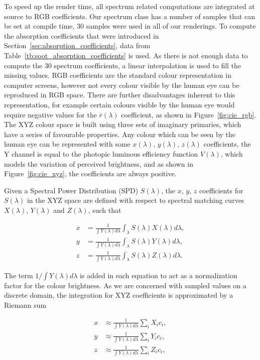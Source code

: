 To speed up the render time, all spectrum related computations are integrated at source to RGB coefficients.
Our spectrum class has a number of samples that can be set at compile time, 30 samples were used in all of our renderings.
To compute the absorption coefficients that were introduced in Section~\ref{sec:absorption_coefficients}, data from Table~\ref{tb:soot_absorption_coefficients} is used.
As there is not enough data to compute the 30 spectrum coefficients, a linear interpolation is used to fill the missing values.
RGB coefficients are the standard colour representation in computer screens, however not every colour visible by the human eye can be reproduced in RGB space.
There are further disadvantages inherent to this representation, for example certain colours visible by the human eye would require negative values for the $\bar{r}(\lambda)$ coefficient, as shown in Figure~\ref{fig:cie_rgb}.
The XYZ colour space is built using three sets of imaginary primaries, which have a series of favourable properties.
Any colour which can be seen by the human eye can be represented with some $x(\lambda)$, $y(\lambda)$, $z(\lambda)$ coefficients, the Y channel is equal to the photopic luminous efficiency function $V(\lambda)$, which models the variation of perceived brightness, and as shown in Figure~\ref{fig:cie_xyz}, the coefficients are always positive.

Given a Spectral Power Distribution (SPD) $S(\lambda)$, the $x$, $y$, $z$ coefficients for $S(\lambda)$ in the XYZ space are defined with respect to spectral matching curves $X(\lambda)$, $Y(\lambda)$ and $Z(\lambda)$, such that

\begin{equation}
\begin{split}
x &= \frac{1}{\int Y(\lambda) d\lambda} \int_\lambda S(\lambda) X(\lambda) d\lambda, \\
y &= \frac{1}{\int Y(\lambda) d\lambda} \int_\lambda S(\lambda) Y(\lambda) d\lambda, \\
z &= \frac{1}{\int Y(\lambda) d\lambda} \int_\lambda S(\lambda) Z(\lambda) d\lambda.
\end{split}
\end{equation}

The term $1 / \int Y(\lambda) d\lambda$ is added in each equation to act as a normalization factor for the colour brightness. 
As we are concerned with sampled values on a discrete domain, the integration for XYZ coefficients is approximated by a Riemann sum

\begin{equation}
\begin{split}
x &\approx \frac{1}{\int Y(\lambda) d\lambda} \sum_i X_i c_i, \\
y &\approx \frac{1}{\int Y(\lambda) d\lambda} \sum_i Y_i c_i, \\
z &\approx \frac{1}{\int Y(\lambda) d\lambda} \sum_i Z_i c_i,
\end{split}
\end{equation}

